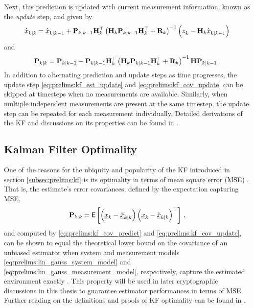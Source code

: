 Next, this prediction is updated with current measurement information, known as the \textit{update} step, and given by
\begin{equation}\label{eq:prelims:kf_est_update}
    \hat{{\underline{x}}}_{k|k} = \hat{{\underline{x}}}_{k|k-1}+{{\mathbf{P}}}_{k|k-1}{{\mathbf{H}}}_k^\top\left({{\mathbf{H}}}_k{{\mathbf{P}}}_{k|k-1}{{\mathbf{H}}}_k^\top + {{\mathbf{R}}}_k\right)^{-1}\left({\underline{z}}_k-{{\mathbf{H}}}_k\hat{{\underline{x}}}_{k|k-1}\right)
\end{equation}
and
\begin{equation}\label{eq:prelims:kf_cov_update}
    {\ensuremath{{\mathbf{P}}}}_{k|k} = {{\mathbf{P}}}_{k|k-1}-{{\mathbf{P}}}_{k|k-1}{{\mathbf{H}}}_k^\top\left({{\mathbf{H}}}_k{{\mathbf{P}}}_{k|k-1}{{\mathbf{H}}}_k^\top + {{\mathbf{R}}}_k\right)^{-1}{{\mathbf{H}}}{{\mathbf{P}}}_{k|k-1}\,.
\end{equation}
In addition to alternating prediction and update steps as time progresses, the update step \eqref{eq:prelims:kf_est_update} and \eqref{eq:prelims:kf_cov_update} can be skipped at timesteps when no measurements are available. Similarly, when multiple independent measurements are present at the same timestep, the update step can be repeated for each measurement individually. Detailed derivations of the KF and discussions on its properties can be found in \cite[Chap.~6]{haugBayesianEstimationTracking2012}.

% 
% 

\subsection{Kalman Filter Optimality}\label{subsec:prelims:kf_opt}
One of the reasons for the ubiquity and popularity of the KF introduced in section \ref{subsec:prelims:kf} is its optimality in terms of mean square error (MSE) \cite{simonOptimalStateEstimation2006,haugBayesianEstimationTracking2012,crassidisOptimalEstimationDynamic2004,chuiKalmanFilteringRealTime2013,maybeckStochasticModelsEstimation1982}. That is, the estimate's error covariances, defined by the expectation capturing MSE,
\begin{equation}
    {\ensuremath{{\mathbf{P}}}}_{k|k} = \mathsf{E}\left[\left({\underline{x}}_k - \hat{{\underline{x}}}_{k|k}\right)\left({\underline{x}}_k - \hat{{\underline{x}}}_{k|k}\right)^\top\right]\,,
\end{equation}
and computed by \eqref{eq:prelims:kf_cov_predict} and \eqref{eq:prelims:kf_cov_update}, can be shown to equal the theoretical lower bound on the covariance of an unbiased estimator when system and measurement models \eqref{eq:prelims:lin_gauss_system_model} and \eqref{eq:prelims:lin_gauss_measurement_model}, respectively, capture the estimated environment exactly \cite{haugBayesianEstimationTracking2012,tichavskyPosteriorCramerRaoBounds1998}. This property will be used in later cryptographic discussions in this thesis to guarantee estimator performances in terms of MSE. Further reading on the definitions and proofs of KF optimality can be found in \cite[Chap.~6]{haugBayesianEstimationTracking2012}.

